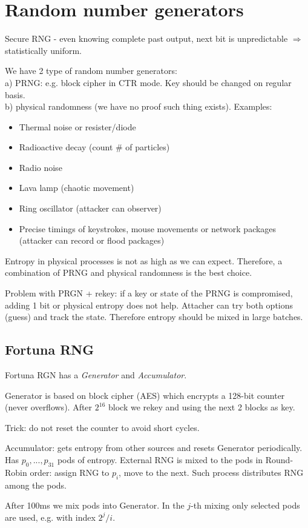 \section{\texorpdfstring{Random number generators}{Random number generators}}
\vspace{5mm}
\large

\begin{definition}
	Secure RNG - even knowing complete past output, next bit is unpredictable $\Rightarrow$ statistically uniform.
\end{definition}

We have 2 type of random number generators:\\
a) PRNG: e.g. block cipher in CTR mode. Key should be changed on regular basis.\\
b) physical randomness (we have no proof such thing exists).
Examples:

\begin{itemize}
	\item Thermal noise or resister/diode
	\item Radioactive decay (count \# of particles)
	\item Radio noise
	\item Lava lamp (chaotic movement)
	\item Ring oscillator (attacker can observer)
	\item Precise timings of keystrokes, mouse movements or network packages (attacker can record or flood packages)
\end{itemize}

\begin{note}
	Entropy in physical processes is not as high as we can expect.
	Therefore, a combination of PRNG and physical randomness is the best choice.
\end{note}

Problem with PRGN + rekey: if a key or state of the PRNG is compromised, adding 1 bit or physical entropy does not help. Attacher can try both options (guess) and track the state. Therefore entropy should be mixed in large batches.

\subsection{Fortuna RNG}
\begin{definition}
	Fortuna RGN has a \emph{Generator} and \emph{Accumulator}.

	Generator is based on block cipher (AES) which encrypts a 128-bit counter (never overflows). After $2^{16}$ block we rekey and using the next 2 blocks as key.

	Trick: do not reset the counter to avoid short cycles.

	Accumulator: gets entropy from other sources and resets Generator periodically.
	Has $p_0, ..., p_{31}$ pods of entropy. External RNG is mixed to the pods in Round-Robin order: assign RNG to $p_i$, move to the next.
	Such process distributes RNG among the pods.

	After 100ms we mix pods into Generator. In the $j$-th mixing only selected pods are used, e.g. with index $2^j/i$.
\end{definition}

